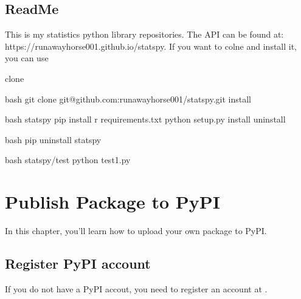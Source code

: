 \documentclass[letterpaper,12pt,english]{sphinxmanual}
\begin{document}
\section{ReadMe}
\label{\detokenize{pack:readme}}
%
\begin{sphinxVerbatim}[commandchars=\\\{\}]

This is my statistics python library repositories.
The API can be found at: https://runawayhorse001.github.io/statspy.
If you want to colne and install it, you can use

\PYGZhy{} clone

bash
git clone git@github.com:runawayhorse001/statspy.git
\PYGZhy{} install

bash
 statspy
pip install \PYGZhy{}r requirements.txt
python setup.py install
\PYGZhy{} uninstall

bash
pip uninstall statspy

\PYGZhy{} 

bash
 statspy/test
python test1.py
\end{sphinxVerbatim}


\chapter{Publish Package to PyPI}
\label{\detokenize{pypi:publish-package-to-pypi}}\label{\detokenize{pypi:pypi}}\label{\detokenize{pypi::doc}}
In this chapter, you’ll learn how to upload your own package to PyPI.


\section{Register PyPI account}
\label{\detokenize{pypi:register-pypi-account}}
If you do not have a PyPI accout, you need to register an account at  .
\end{document}
